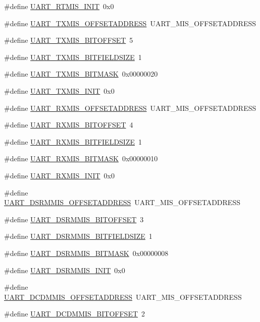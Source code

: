 \begin{DoxyCompactItemize}
\item 
\#define \hyperlink{a00575_ac0c2e1816dae96835d2ebdb7be3e4ff6}{UART\_\-RTMIS\_\-INIT}~0x0
\item 
\#define \hyperlink{a00575_a522053fde58be7f8929a5f5ef923dbfc}{UART\_\-TXMIS\_\-OFFSETADDRESS}~UART\_\-MIS\_\-OFFSETADDRESS
\item 
\#define \hyperlink{a00575_a193f598b79dd2e4487f129896d8b2dcf}{UART\_\-TXMIS\_\-BITOFFSET}~5
\item 
\#define \hyperlink{a00575_a70a885189e6bce037c924f5ea792365d}{UART\_\-TXMIS\_\-BITFIELDSIZE}~1
\item 
\#define \hyperlink{a00575_a395b51d34c23f26f98a43fbe898969d7}{UART\_\-TXMIS\_\-BITMASK}~0x00000020
\item 
\#define \hyperlink{a00575_ad8cf69d908852cfd4cc1bda9f052b866}{UART\_\-TXMIS\_\-INIT}~0x0
\item 
\#define \hyperlink{a00575_a212478ec4b0cd2d359fb69b4f39b81a0}{UART\_\-RXMIS\_\-OFFSETADDRESS}~UART\_\-MIS\_\-OFFSETADDRESS
\item 
\#define \hyperlink{a00575_aa11241990207c778f1454e69c818ce0b}{UART\_\-RXMIS\_\-BITOFFSET}~4
\item 
\#define \hyperlink{a00575_a6fe3e95c0b084a1b0b993ac3ca542684}{UART\_\-RXMIS\_\-BITFIELDSIZE}~1
\item 
\#define \hyperlink{a00575_a658775b1739164966559a3ccdf1d60c9}{UART\_\-RXMIS\_\-BITMASK}~0x00000010
\item 
\#define \hyperlink{a00575_a8b50b0bc2e757cd0275270905f59f4cd}{UART\_\-RXMIS\_\-INIT}~0x0
\item 
\#define \hyperlink{a00575_ab81acbc0fa07aae11c523e654495c646}{UART\_\-DSRMMIS\_\-OFFSETADDRESS}~UART\_\-MIS\_\-OFFSETADDRESS
\item 
\#define \hyperlink{a00575_a5725786ab76fc410d91de3a0381bb445}{UART\_\-DSRMMIS\_\-BITOFFSET}~3
\item 
\#define \hyperlink{a00575_a5ae08bad0f388223a391e4bc79917b0e}{UART\_\-DSRMMIS\_\-BITFIELDSIZE}~1
\item 
\#define \hyperlink{a00575_a76c40e15550a4cb2327edbfcf22308f8}{UART\_\-DSRMMIS\_\-BITMASK}~0x00000008
\item 
\#define \hyperlink{a00575_a68b4d831e83e44ef682f1e34bcd1b540}{UART\_\-DSRMMIS\_\-INIT}~0x0
\item 
\#define \hyperlink{a00575_a812eb554e9f1c6e2e07e40770441fc32}{UART\_\-DCDMMIS\_\-OFFSETADDRESS}~UART\_\-MIS\_\-OFFSETADDRESS
\item 
\#define \hyperlink{a00575_a39ec2ffd00c50bce447e9db8f7d27288}{UART\_\-DCDMMIS\_\-BITOFFSET}~2

\end{DoxyCompactItemize}
